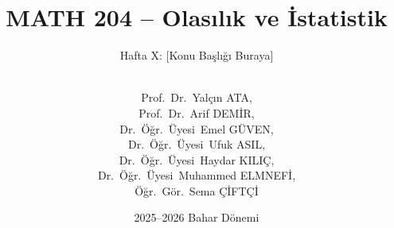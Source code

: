
\usepackage{pgfpages}
\usepackage{ragged2e}
\usepackage{booktabs}
\usepackage{amssymb}
\usepackage{fontawesome5}
\usepackage{tikz}
\usepackage{pgfplots}
\pgfplotsset{compat=1.18}


\author[Mühendislik Fakültesi]{\\Prof.~Dr.~Yalçın ATA,\\ 
Prof.~Dr.~Arif DEMİR,\\ Dr.~Öğr.~Üyesi~Emel GÜVEN,\\ Dr.~Öğr.~Üyesi~Ufuk ASIL,\\ Dr.~Öğr.~Üyesi~Haydar KILIÇ,\\ Dr.~Öğr.~Üyesi~Muhammed ELMNEFİ,\\ Öğr.~Gör.~Sema ÇİFTÇİ} %

\title{MATH 204 -- Olasılık ve İstatistik}                     %
\subtitle{Hafta X\@: [Konu Başlığı Buraya]}                   %

\date{2025--2026 Bahar Dönemi}                                           %


